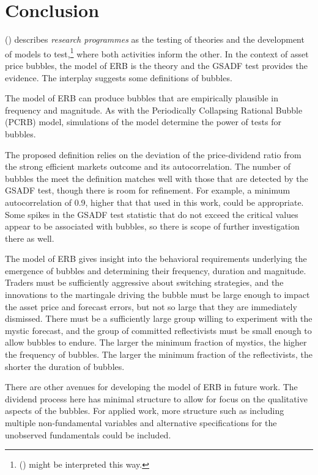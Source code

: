 \documentclass[12pt]{article}
\begin{document}
\section{Conclusion}

\citeauthor{lakatos1970falsification} (\citeyear{lakatos1970falsification}) describes \textit{research programmes} as the testing of theories and the development of models to test,\footnote{\citeauthor{kuhn1962structure} (\citeyear{kuhn1962structure}) might be interpreted this way.} where both activities inform the other. In the context of asset price bubbles, the model of ERB is the theory and the GSADF test provides the evidence. The interplay suggests some definitions of bubbles. 

The model of ERB can produce bubbles that are empirically plausible in frequency and magnitude. As with the Periodically Collapsing Rational Bubble (PCRB) model, simulations of the model determine the power of tests for bubbles. 

The proposed definition relies on the deviation of the price-dividend ratio from the strong efficient markets outcome and its autocorrelation. The number of bubbles the meet the definition matches well with those that are detected by the GSADF test, though there is room for refinement. For example, a minimum autocorrelation of 0.9, higher that that used in this work, could be appropriate. Some spikes in the GSADF test statistic that do not exceed the critical values appear to be associated with bubbles, so there is scope of further investigation there as well.

The model of ERB gives insight into the behavioral requirements underlying the emergence of bubbles and determining their frequency, duration and magnitude. Traders must be sufficiently aggressive about switching strategies, and the innovations to the martingale driving the bubble must be large enough to impact the asset price and forecast errors, but not so large that they are immediately dismissed. There must be a sufficiently large group willing to experiment with the mystic forecast, and the group of committed reflectivists must be small enough to allow bubbles to endure. The larger the minimum fraction of mystics, the higher the frequency of bubbles. The larger the minimum fraction of the reflectivists, the shorter the duration of bubbles. 

There are other avenues for developing the model of ERB in future work. The dividend process here has minimal structure to allow for focus on the qualitative aspects of the bubbles. For applied work, more structure such as including multiple non-fundamental variables and alternative specifications for the unobserved fundamentals could be included.
\end{document}
